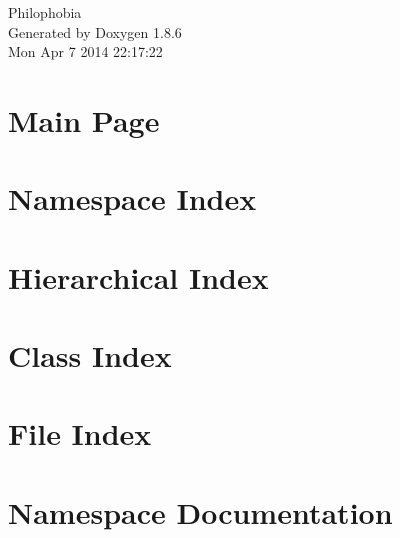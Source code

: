 \documentclass[twoside]{book}
\newcommand{\clearemptydoublepage}{%
  \newpage{\pagestyle{empty}\cleardoublepage}%
}
\begin{document}
\hypersetup{pageanchor=false}
\begin{titlepage}
\vspace*{7cm}
\begin{center}%
{\Large Philophobia }\\
\vspace*{1cm}
{\large Generated by Doxygen 1.8.6}\\
\vspace*{0.5cm}
{\small Mon Apr 7 2014 22:17:22}\\
\end{center}
\end{titlepage}
\clearemptydoublepage
\tableofcontents
\clearemptydoublepage
{}
\hypersetup{pageanchor=true}

\chapter{Main Page}
\label{index}\hypertarget{index}{}
\chapter{Namespace Index}

\chapter{Hierarchical Index}

\chapter{Class Index}

\chapter{File Index}

\chapter{Namespace Documentation}












\end{document}
